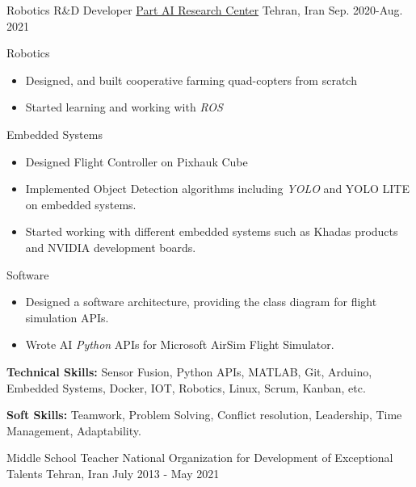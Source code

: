 \begin{cventries}
  
  \cventry
{Robotics R\&D Developer}  %
    {\href{https://ir.linkedin.com/company/partdp-ai}{Part AI Research Center}} %
    {Tehran, Iran} %
    {Sep. 2020-Aug. 2021} %
    {
      \begin{cvitems} %
                \item{Robotics}
        \begin{itemize}[label= - ]
            \item {Designed, and built cooperative farming quad-copters from scratch}
             \item {Started learning and working with \textit{ROS}}
        \end{itemize}
        \item{Embedded Systems}
        \begin{itemize}[label=-]
            \item {Designed Flight Controller on Pixhauk Cube}
            \item {Implemented Object Detection algorithms including \textit{YOLO} and YOLO LITE on embedded systems.}
            \item {Started working with different embedded systems such as Khadas products and NVIDIA development boards.}
        \end{itemize}
        \item{Software}
        \begin{itemize}[label = -]
        \item {Designed a software architecture, providing the class diagram for flight simulation APIs.}
            \item {Wrote AI \textit{Python} APIs for Microsoft AirSim Flight Simulator.}
        \end{itemize}
        \item {\textbf{Technical Skills:} Sensor Fusion, Python APIs, MATLAB, Git, Arduino, Embedded Systems, Docker, IOT, Robotics, Linux, Scrum, Kanban, etc.}
        \item {\textbf{Soft Skills:} Teamwork, Problem Solving, Conflict resolution, Leadership, Time Management, Adaptability.}
      \end{cvitems}
    } 
\cventry
    {Middle School Teacher}
    {National Organization for Development of Exceptional Talents}
    {Tehran, Iran}
    {July 2013 -  May 2021}
    {
      \begin{cvitems} %

\end{cvitems}}
\end{cventries}
